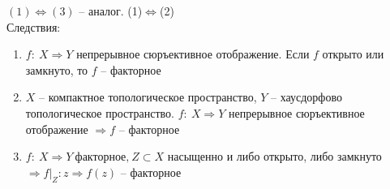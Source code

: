 	$(1)\Leftrightarrow (3)$ -- аналог. (1)$\Leftrightarrow$(2)\\
	Следствия: 
	\begin{enumerate}
		\item 
		$f:\ X\Rightarrow Y$ непрерывное сюръективное отображение. Если $f$ открыто или замкнуто, то $f$ -- факторное
		\item 
		$X$ -- компактное топологическое пространство, $Y$ -- хаусдорфово топологическое пространство. $f:\ X\Rightarrow Y$ непрерывное сюръективное отображение $\Rightarrow f$ -- факторное
		\item 
		$f:\ X\Rightarrow Y\ \text{факторное,}\ Z \subset X$ насыщенно и либо открыто, либо замкнуто $\Rightarrow f|_{Z}: z \Rightarrow f(z)$ -- факторное 
	\end{enumerate}


\newpage

